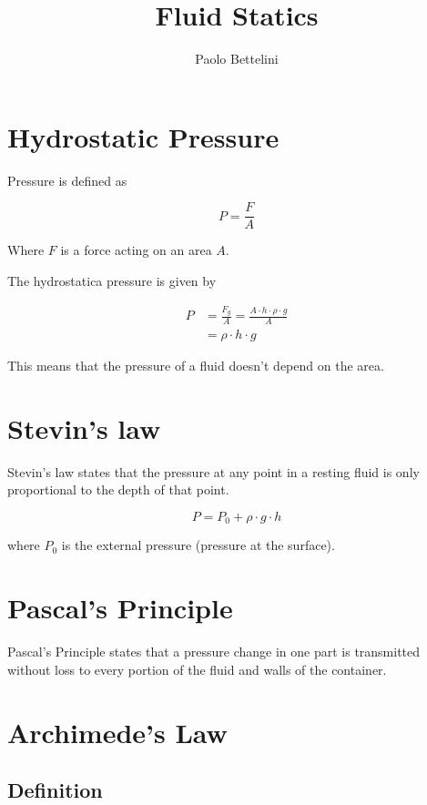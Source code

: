 \documentclass{article}
\title{Fluid Statics}
\author{Paolo Bettelini}
\date{}
\begin{document}
\maketitle
\tableofcontents
\pagebreak

\section{Hydrostatic Pressure}

Pressure is defined as 

\[
    P = \frac{F}{A}
\]

Where \(F\) is a force acting on an area \(A\).

The hydrostatica pressure is given by

\begin{align*}
    P &= \frac{F_g}{A} = \frac{A \cdot h \cdot \rho \cdot g}{A} \\
    &= \rho \cdot h \cdot g
\end{align*}

This means that the pressure of a fluid doesn't depend
on the area.

\section{Stevin's law}

Stevin's law states that the pressure at any point
in a resting fluid is only proportional to the depth of that point.

\[
    P = P_0 + \rho \cdot g \cdot h
\]

where \(P_0\) is the external pressure (pressure at the surface).

\section{Pascal's Principle}

Pascal's Principle states that a pressure change in one part
is transmitted without loss to every portion of the fluid and walls of the container.

\section{Archimede's Law}

\subsection{Definition}
\end{document}
